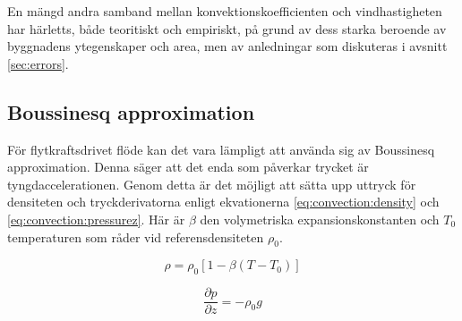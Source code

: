 En mängd andra samband mellan konvektionskoefficienten och vindhastigheten har härletts, både teoritiskt och empiriskt, på grund av dess starka beroende av byggnadens ytegenskaper och area, men av anledningar som diskuteras i avsnitt \ref{sec:errors}.\cite{palyvos08}


\subsection{Boussinesq approximation}

För flytkraftsdrivet flöde kan det vara lämpligt att använda sig av
Boussinesq approximation. Denna säger att det enda som påverkar trycket är
tyngdaccelerationen. Genom detta är det möjligt att sätta upp uttryck för densiteten
och tryckderivatorna enligt ekvationerna \eqref{eq:convection:density}
och \eqref{eq:convection:pressurez}. Här är
$\beta$ den volymetriska expansionskonstanten och
$T_0$ temperaturen som råder vid referensdensiteten $\rho_0$.

\begin{equation}
\label{eq:convection:density}
\rho = \rho_0[1-\beta(T-T_0)]
\end{equation}

\begin{equation}
\label{eq:convection:pressurez}
\frac{\partial p}{\partial z} = -\rho_0g
\end{equation}


